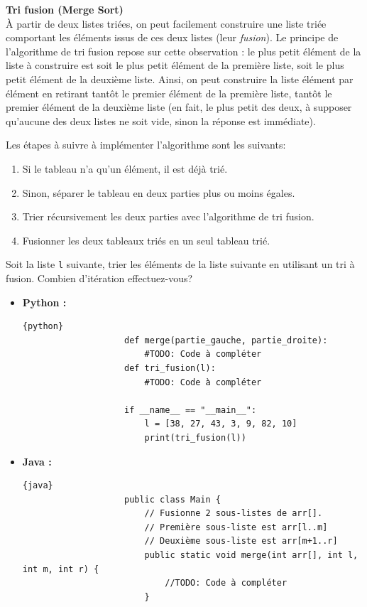 \begin{Exercice} [30 minutes] \textbf{Tri fusion (Merge Sort)} \\
    À partir de deux listes triées, on peut facilement construire une liste triée comportant les éléments issus de ces deux listes (leur \textit{fusion}). Le principe de l'algorithme de tri fusion repose sur cette observation : le plus petit élément de la liste à construire est soit le plus petit élément de la première liste, soit le plus petit élément de la deuxième liste. Ainsi, on peut construire la liste élément par élément en retirant tantôt le premier élément de la première liste, tantôt le premier élément de la deuxième liste (en fait, le plus petit des deux, à supposer qu'aucune des deux listes ne soit vide, sinon la réponse est immédiate). 
    
    Les étapes à suivre à implémenter l'algorithme sont les suivants:
    \begin{enumerate}
        \item Si le tableau n'a qu'un élément, il est déjà trié.
        \item Sinon, séparer le tableau en deux parties plus ou moins égales.
        \item Trier récursivement les deux parties avec l'algorithme de tri fusion.
        \item Fusionner les deux tableaux triés en un seul tableau trié.
    \end{enumerate}
    
    Soit la liste \lstinline{l} suivante, trier les éléments de la liste suivante en utilisant un tri à fusion. Combien d'itération effectuez-vous?
    
    \begin{itemize}
        \item \textbf{Python :}
                \begin{lstlisting}{python}
                    def merge(partie_gauche, partie_droite):
                        #TODO: Code à compléter
                    def tri_fusion(l):
                        #TODO: Code à compléter
                    
                    if __name__ == "__main__":
                        l = [38, 27, 43, 3, 9, 82, 10]
                        print(tri_fusion(l))
                \end{lstlisting}
        \item \textbf{Java :}
                \begin{lstlisting}{java}
                    public class Main {
                        // Fusionne 2 sous-listes de arr[]. 
                        // Première sous-liste est arr[l..m] 
                        // Deuxième sous-liste est arr[m+1..r] 
                        public static void merge(int arr[], int l, int m, int r) {
                            //TODO: Code à compléter 
                        }
                        

\end{lstlisting}
\end{itemize}
\end{Exercice}
